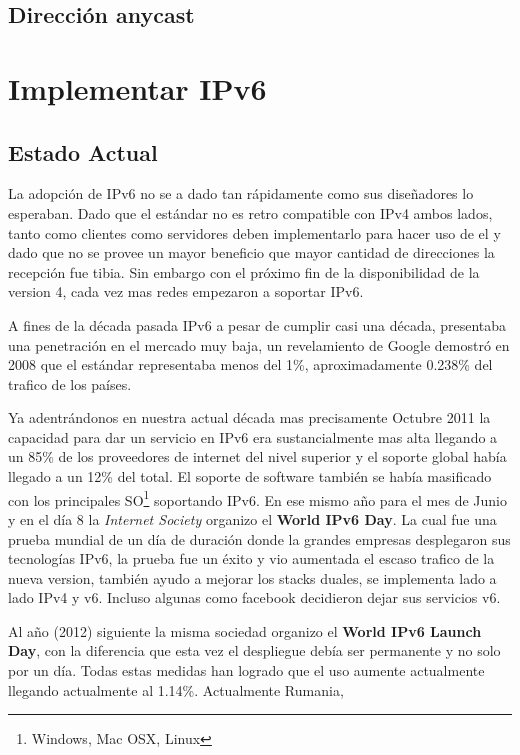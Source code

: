 \documentclass[11pt,a4paper]{article}
\begin{document}
\subsection{Dirección anycast}


\section{Implementar IPv6}

\subsection{Estado Actual}
La adopción de IPv6 no se a dado tan rápidamente como sus diseñadores lo esperaban. Dado que el 
estándar no es retro compatible con IPv4 ambos lados, tanto como clientes como servidores deben 
implementarlo para hacer uso de el y dado que no se provee un mayor beneficio que mayor cantidad de 
direcciones la recepción fue tibia. Sin embargo con el próximo fin de la disponibilidad de la 
version 4, cada vez mas redes empezaron a soportar IPv6.\par
A fines de la década pasada IPv6 a pesar de cumplir casi una década, presentaba una penetración en 
el mercado muy baja, un revelamiento de Google demostró en 2008 que el estándar representaba menos
del 1\%, aproximadamente 0.238\% del trafico de los países\cite{googleIPv6}.\par
Ya adentrándonos en nuestra actual década mas precisamente Octubre 2011 la capacidad para dar un 
servicio en IPv6 era sustancialmente mas alta llegando a un 85\% de los proveedores de internet del 
nivel superior y el soporte global había llegado a un 12\% del total. El soporte de software también 
se había masificado con los principales SO\footnote{Windows, Mac OSX, Linux} soportando IPv6. En ese 
mismo año para el mes de Junio y en el día 8 la \emph{Internet Society} organizo el \textbf{World 
IPv6 Day}. La cual fue una prueba mundial de un día de duración donde la grandes empresas 
desplegaron sus tecnologías IPv6, la prueba fue un éxito y vio aumentada el escaso trafico de la 
nueva version, también ayudo a mejorar los stacks duales, se implementa lado a lado IPv4 y v6. 
Incluso algunas como facebook decidieron dejar sus servicios v6.\par
Al año (2012) siguiente la misma sociedad organizo el \textbf{World IPv6 Launch Day}, con la 
diferencia que esta vez el despliegue debía ser permanente y no solo por un día. Todas estas medidas 
han logrado que el uso aumente actualmente llegando actualmente al 1.14\%. Actualmente Rumania, 
\end{document}

